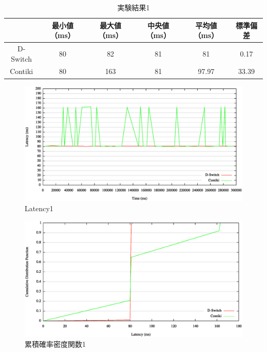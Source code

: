 \begin{table}[htbp]
  \centering
  \caption{実験結果1}
  \begin{tabular}{|c||c|c|c|c|c|} \hline
    \backslashbox{}{} & 最小値（ms） & 最大値（ms） & 中央値（ms） & 平均値（ms） & 標準偏差 \\ \hline \hline
    D-Switch & 80 & 82 & 81 & 81 & 0.17 \\ \hline
    Contiki & 80 & 163 & 81 & 97.97 & 33.39 \\ \hline
  \end{tabular}
  \label{tab:latency1}
\end{table}

\begin{figure}[htbp]
 \begin{center}
  \includegraphics[width=120mm]{./images/latency1.eps}
 \end{center}
 \caption{Latency1}
 \label{fig:latency1}
\end{figure}

\begin{figure}[htbp]
 \begin{center}
  \includegraphics[width=120mm]{./images/cdf1.eps}
 \end{center}
 \caption{累積確率密度関数1}
 \label{fig:cdf1}
\end{figure}



